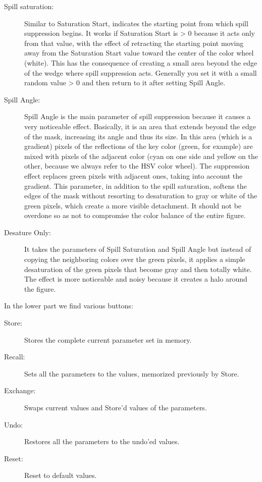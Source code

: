 \begin{description}
	\item[Spill saturation:] Similar to Saturation Start, indicates the starting point from which spill suppression begins. It works if Saturation Start is > 0 because it acts only from that value, with the effect of retracting the starting point moving away from the Saturation Start value toward the center of the color wheel (white). This has the consequence of creating a small area beyond the edge of the wedge where spill suppression acts. Generally you set it with a small random value > 0 and then return to it after setting Spill Angle.
	\item[Spill Angle:] Spill Angle is the main parameter of spill suppression because it causes a very noticeable effect.  Basically, it is an area that extends beyond the edge of the mask, increasing its angle and thus its size. In this area (which is a gradient) pixels of the reflections of the key color (green, for example) are mixed with pixels of the adjacent color (cyan on one side and yellow on the other, because we always refer to the HSV color wheel). The suppression effect replaces green pixels with adjacent ones, taking into account the gradient. This parameter, in addition to the spill saturation, softens the edges of the mask without resorting to desaturation to gray or white of the green pixels, which create a more visible detachment. It should not be overdone so as not to compromise the color balance of the entire figure.
	\item[Desature Only:] It takes the parameters of Spill Saturation and Spill Angle but instead of copying the neighboring colors over the green pixels, it applies a simple desaturation of the green pixels that become gray and then totally white. The effect is more noticeable and noisy because it creates a halo around the figure.
\end{description}

In the lower part we find various buttons:

\begin{description}
	\item[Store:] Stores the complete current parameter set in memory.
	\item[Recall:] Sets all the parameters to the values, memorized previously by Store.
	\item[Exchange:] Swaps current values and Store'd values of the parameters.
	\item[Undo:] Restores all the parameters to the undo'ed values.
	\item[Reset:] Reset to default values.
\end{description}

